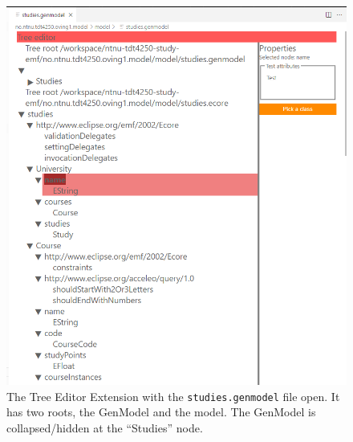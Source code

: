 \begin{figure}[H]  %
  \centering
  \includegraphics[width=\textwidth]{figures/gitpod-vscode-genmodel.png}
  \caption[Tree Editor Extension showing studies.genmodel]{The Tree Editor Extension with the \texttt{studies.genmodel} file open. It has two roots, the GenModel and the model. The GenModel is collapsed/hidden at the ``Studies'' node.}\label{fig:gitpod-ext-genmodel}
\end{figure}

